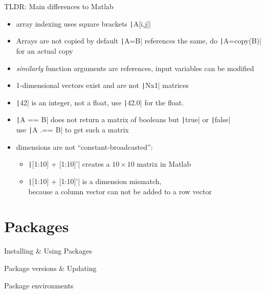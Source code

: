 \documentclass[aspectratio=169, 12pt]{beamer}
\begin{document}
    \begin{frame}[fragile]{TLDR: Main differences to Matlab}
        \begin{itemize}
            \item array indexing uses square brackets \texttt|A[i,j]|
            \item Arrays are not copied by default \texttt|A=B| references the same, do \texttt|A=copy(B)| for an actual copy
            \item \emph{similarly} function arguments are references, \alert{input variables can be modified}
            \item 1-dimensional vectors exist and are not \texttt|Nx1| matrices
            \item \texttt|42| is an integer, not a float, use \texttt|42.0| for the float.
            \item \texttt|A == B| does not return a matrix of booleans but \texttt|true| or \texttt|false|\\
            use \texttt|A .== B| to get such a matrix
            \item dimensions are not “constant-broadcasted”:\\
            \begin{itemize}
                \item \texttt|[1:10] + [1:10]'| creates a $10\times 10$ matrix in Matlab
                \item \texttt|[1:10] + [1:10]'| is a dimension mismatch,\\
                 because a column vector can not be added to a row vector
            \end{itemize}
        \end{itemize}
    \end{frame}
    \section{Packages}
    \begin{frame}{Installing \& Using Packages}

    \end{frame}
    \begin{frame}{Package versions \& Updating}

    \end{frame}
    \begin{frame}{Package environments}

    \end{frame}
\end{document}
